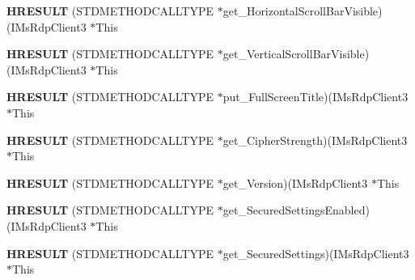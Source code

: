 \begin{DoxyCompactItemize}
\mbox{\label{struct_i_ms_rdp_client3_vtbl_a3d292de5b3efd05a2a168cb157d5fcb8}} 
{\bfseries H\+R\+E\+S\+U\+LT} (S\+T\+D\+M\+E\+T\+H\+O\+D\+C\+A\+L\+L\+T\+Y\+PE $\ast$get\+\_\+\+Horizontal\+Scroll\+Bar\+Visible)(I\+Ms\+Rdp\+Client3 $\ast$This
\item 
\mbox{\label{struct_i_ms_rdp_client3_vtbl_ac0968385e86c42726dec0205a50ff781}} 
{\bfseries H\+R\+E\+S\+U\+LT} (S\+T\+D\+M\+E\+T\+H\+O\+D\+C\+A\+L\+L\+T\+Y\+PE $\ast$get\+\_\+\+Vertical\+Scroll\+Bar\+Visible)(I\+Ms\+Rdp\+Client3 $\ast$This
\item 
\mbox{\label{struct_i_ms_rdp_client3_vtbl_a5b651f3cfdbea362ac74baee2a1f15c7}} 
{\bfseries H\+R\+E\+S\+U\+LT} (S\+T\+D\+M\+E\+T\+H\+O\+D\+C\+A\+L\+L\+T\+Y\+PE $\ast$put\+\_\+\+Full\+Screen\+Title)(I\+Ms\+Rdp\+Client3 $\ast$This
\item 
\mbox{\label{struct_i_ms_rdp_client3_vtbl_a35b1d6360c3fa2e36af8f30eb68eedf7}} 
{\bfseries H\+R\+E\+S\+U\+LT} (S\+T\+D\+M\+E\+T\+H\+O\+D\+C\+A\+L\+L\+T\+Y\+PE $\ast$get\+\_\+\+Cipher\+Strength)(I\+Ms\+Rdp\+Client3 $\ast$This
\item 
\mbox{\label{struct_i_ms_rdp_client3_vtbl_adfd07328f8e31ff95a76b335c2c8a985}} 
{\bfseries H\+R\+E\+S\+U\+LT} (S\+T\+D\+M\+E\+T\+H\+O\+D\+C\+A\+L\+L\+T\+Y\+PE $\ast$get\+\_\+\+Version)(I\+Ms\+Rdp\+Client3 $\ast$This
\item 
\mbox{\label{struct_i_ms_rdp_client3_vtbl_a39a2199e1d3c07ed8d1ae438c4cb9652}} 
{\bfseries H\+R\+E\+S\+U\+LT} (S\+T\+D\+M\+E\+T\+H\+O\+D\+C\+A\+L\+L\+T\+Y\+PE $\ast$get\+\_\+\+Secured\+Settings\+Enabled)(I\+Ms\+Rdp\+Client3 $\ast$This
\item 
\mbox{\label{struct_i_ms_rdp_client3_vtbl_abaf9e16e800fcc829c78f34fea3caaea}} 
{\bfseries H\+R\+E\+S\+U\+LT} (S\+T\+D\+M\+E\+T\+H\+O\+D\+C\+A\+L\+L\+T\+Y\+PE $\ast$get\+\_\+\+Secured\+Settings)(I\+Ms\+Rdp\+Client3 $\ast$This
\item 
\mbox{\label{struct_i_ms_rdp_client3_vtbl_a63a6f28d4788f75750e111947c32308b}} 

\end{DoxyCompactItemize}
